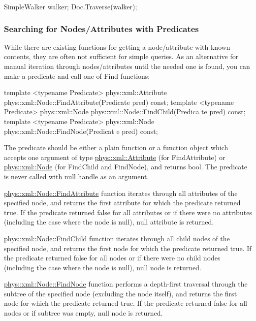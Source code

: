 \begin{DoxyCode}
 SimpleWalker walker;
 Doc.Traverse(walker);
\end{DoxyCode}
 \hypertarget{XMLManual_XMLAccessingPredicates}{}\subsubsection{Searching for Nodes/Attributes with Predicates}\label{XMLManual_XMLAccessingPredicates}
While there are existing functions for getting a node/attribute with known contents, they are often not sufficient for simple queries. As an alternative for manual iteration through nodes/attributes until the needed one is found, you can make a predicate and call one of Find functions: 
\begin{DoxyCode}
 template <typename Predicate> phys::xml::Attribute 
      phys::xml::Node::FindAttribute(Predicate pred) const;
 template <typename Predicate> phys::xml::Node phys::xml::Node::FindChild(Predica
      te pred) const;
 template <typename Predicate> phys::xml::Node phys::xml::Node::FindNode(Predicat
      e pred) const;
\end{DoxyCode}
 The predicate should be either a plain function or a function object which accepts one argument of type \hyperlink{classphys_1_1xml_1_1Attribute}{phys::xml::Attribute} (for FindAttribute) or \hyperlink{classphys_1_1xml_1_1Node}{phys::xml::Node} (for FindChild and FindNode), and returns bool. The predicate is never called with null handle as an argument. \par
 \par
 \hyperlink{classphys_1_1xml_1_1Node_ab1ad6ee2e78ddd3f591faffe675ed910}{phys::xml::Node::FindAttribute} function iterates through all attributes of the specified node, and returns the first attribute for which the predicate returned true. If the predicate returned false for all attributes or if there were no attributes (including the case where the node is null), null attribute is returned. \par
 \par
 \hyperlink{classphys_1_1xml_1_1Node_a1041d264f8927adb691c47ccacff28d4}{phys::xml::Node::FindChild} function iterates through all child nodes of the specified node, and returns the first node for which the predicate returned true. If the predicate returned false for all nodes or if there were no child nodes (including the case where the node is null), null node is returned. \par
 \par
 \hyperlink{classphys_1_1xml_1_1Node_ab2311cefdf1d7f4886cbebd7350d7731}{phys::xml::Node::FindNode} function performs a depth-\/first traversal through the subtree of the specified node (excluding the node itself), and returns the first node for which the predicate returned true. If the predicate returned false for all nodes or if subtree was empty, null node is returned. \par
